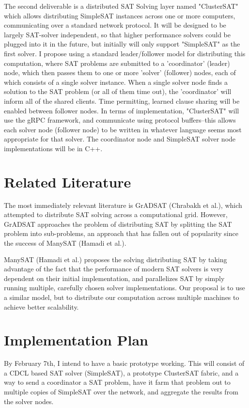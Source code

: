 \documentclass[10pt]{article}
\begin{document}
  The second deliverable is a distributed SAT Solving layer named "ClusterSAT" which allows distributing
  SimpleSAT instances across one or more computers, communicating over a standard network protocol.  It will
  be designed to be largely SAT-solver independent, so that higher performance solvers could be 
  plugged into it in the future, but initially will only support "SimpleSAT" as the first solver.
  I propose using a standard leader/follower model for distributing this computation, 
  where SAT problems are submitted to a 'coordinator' (leader) node, which then passes them to one or more 
  'solver' (follower) nodes, each of which consists of a single solver instance.  When a single solver node finds
  a solution to the SAT problem (or all of them time out), the 'coordinator' will inform all of the shared clients.
  Time permitting, learned clause sharing will be enabled between follower nodes. In terms of implementation, 
  "ClusterSAT" will use the gRPC framework, and communicate using protocol buffers--this allows each solver node 
  (follower node) to be written in whatever language seems most appropriate for that solver.  The coordinator node 
  and SimpleSAT solver node implementations will be in C++.

\section{Related Literature}
  The most immediately relevant literature is GrADSAT (Chrabakh et al.), which attempted to distribute SAT solving
  across a computational grid.  However, GrADSAT approaches the problem of distributing SAT by splitting the SAT problem
  into sub-problems, an approach that has fallen out of popularity since the success of ManySAT (Hamadi et al.).

  ManySAT (Hamadi et al.) proposes the solving distributing SAT by taking advantage of the fact that the performance of
  modern SAT solvers is very dependent on their initial implementation, and parallelizes SAT by simply running multiple,
  carefully chosen solver implementations.  Our proposal is to use a similar model, but to distribute our computation across
  multiple machines to achieve better scalability.

\section{Implementation Plan}
  By February 7th, I intend to have a basic prototype working.  This will consist of a CDCL based SAT solver (SimpleSAT),
  a prototype ClusterSAT fabric, and a way to send a coordinator a SAT problem, have it farm that problem out to multiple 
  copies of SimpleSAT over the network, and aggregate the results from the solver nodes.
\end{document}
